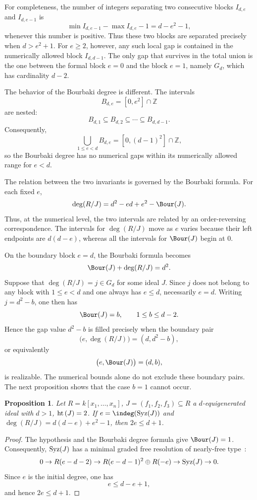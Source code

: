 \documentclass[11pt]{amsart} %
\newtheorem{Proposition}[Theorem]{Proposition}
\theoremstyle{definition}
\def\hht{{\rm ht}\,}
\def\syz{\mbox{\rm Syz}}
\def\hht{{\rm ht}\,}
\begin{document}
For completeness, the number of integers separating two consecutive
blocks $I_{d,e}$ and $I_{d,e-1}$ is
\[
\min I_{d,e-1}-\max I_{d,e}-1=d-e^2-1,
\]
whenever this number is positive. Thus these two blocks are separated
precisely when $d>e^2+1$. For $e\ge2$, however, any such local gap is contained in the numerically allowed block $I_{d,d-1}$. The only gap that survives in
the total union is the one between the formal block $e=0$ and the block
$e=1$, namely $G_d$, which has cardinality $d-2$.

\medskip

The behavior of the Bourbaki degree is different. The intervals
\[
B_{d,e}=[0,e^2]\cap\mathbb Z
\]
are nested:
\[
B_{d,1}\subseteq B_{d,2}\subseteq\cdots\subseteq B_{d,d-1}.
\]
Consequently,
\[
\bigcup_{1\le e<d}B_{d,e}
=[0,(d-1)^2]\cap\mathbb Z,
\]
so the Bourbaki degree has no numerical gaps within its numerically
allowed range for $e<d$.

The relation between the two invariants is governed by the Bourbaki
formula. For each fixed $e$,
\[
\deg(R/J)=d^2-ed+e^2-\Bour(J).
\]
Thus, at the numerical level, the two intervals are related by an
order-reversing correspondence. The intervals for $\deg(R/J)$ move as $e$ varies
because their left endpoints are $d(d-e)$, whereas all the intervals
for $\Bour(J)$ begin at $0$.

On the boundary block $e=d$, the Bourbaki formula becomes
\[
\Bour(J)+\deg(R/J)=d^2.
\]
Suppose that $\deg(R/J)=j\in G_d$ for some ideal $J$. Since $j$ does not belong to
any block with $1\le e<d$ and one always has $e\le d$, necessarily
$e=d$. Writing $j=d^2-b$, one then has
\[
\Bour(J)=b,\qquad 1\le b\le d-2.
\]
Hence the gap value $d^2-b$ is filled precisely when the boundary pair
\[
\bigl(e,\deg(R/J)\bigr)=(d,d^2-b),
\]
or equivalently
\[
\bigl(e,\Bour(J)\bigr)=(d,b),
\]
is realizable. The numerical bounds alone do not exclude these boundary
pairs. The next proposition shows that the case $b=1$ cannot occur.



\begin{Proposition}\label{prop:nearly-free-restriction}
Let $R = k[x_1, \ldots, x_n]$, $J = (f_1, f_2, f_3) \subseteq R$ a $d$-equigenerated ideal with $d > 1$, $\hht(J) = 2$. If $e = \indeg(\syz(J))$ and $\deg(R/J) = d(d-e)+e^2-1$, then $2e \leq d+1$.
\end{Proposition}

\begin{proof}
The hypothesis and the Bourbaki degree formula give $\Bour(J)=1$.
Consequently, $\syz(J)$ has a minimal graded free resolution of
nearly-free type~\cite[Theorem~2.4 and Proposition~2.9]{MFA}:
\[
0\to R(e-d-2)
\to R(e-d-1)^2\oplus R(-e)
\to\syz(J)\to0.
\]
Since $e$ is the initial degree, one has
\[
e\le d-e+1,
\]
and hence $2e\le d+1$.
\end{proof}
\end{document}
